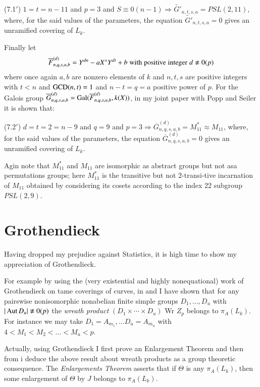 (7.1$'$) $1=t=n-11$ and $p=3$ and $S\equiv 0(n-1) \Rightarrow \widetilde{G'}_{n,t,s,a} = PSL(2,11)$, where, for the said values of the parameters, the equation $ \widetilde{G'}_{n,t,s,a}=0$ gives an unramified covering of $L_{k}$.

Finally let
$$
\overline{F}^{(d)}_{n,q,s,a,b} = Y^{dn}-aX^{x}Y^{dt} + b\; {\rm with\; positive\; integer}\; d\nequiv 0(p)
$$ 
where once again $a,b$ are nonzero elements of $k$ and $n,t,s$ are positive integers with $t<n$ and $\operatorname{GCD}(n,t)=1$ and
$n-t=q=a$ positive power of $p$. For the Galois group $\overline{G}^{(d)}_{n,q,s,a,b} = \operatorname{Gal}(\overline{F}^{(d)}_{n,q,s,a,b}, k(X))$, in my joint paper \cite{chap1-key15} with Popp and Seiler it is shown that:

(7.2$'$) $d=t=2=n-9$ and $q=9$ and $p=3 \Rightarrow \overline{G}^{(d)}_{n,q,s,a,b} =M^{*}_{11}\approx M_{11}$, where, for the said values of the parameters, the equation  $\overline{G}^{(d)}_{n,q,s,a,b} = 0$ gives an unramified covering of $L_{k}$.

Agin note that $M^{*}_{11}$ and $M_{11}$ are isomorphic as abstract groups but not asa permutations groups; here $M^{*}_{11}$ is the transitive but not 2-transi-\break tive incarnation of $M_{11}$ obtained by considering its cosets according to the index 22 subgroup $PSL(2,9)$.

\section{Grothendieck}

Having dropped my prejudice against Statistics, it is high time to show my appreciation of Grothendieck.

For example by using the (very existential and highly nonequational) work of Grothendieck \cite{chap1-key33} on tame coverings of curves, in \cite{chap1-key7} and \cite{chap1-key11} I have shown that for any pairswise nonisomorphic nonabelian finite simple groups $D_{1},\ldots, D_{u}$ with $|\Aut D_{u}| \nequiv 0(p)$ the \textit{wreath product} $(D_{1}\times\cdots\times D_{u})$ Wr $Z_{p}$ belongs to $\pi_{A}(L_{k})$. For instance we may take $D_{1}= A_{m_{1}}, \ldots D_{u} =A_{m_{u}}$ with $4 < M_{1} < M_{2} < \ldots < M_{u} < p$. 

Actually, using Grothendieck \cite{chap1-key33} I first prove an Enlargement Theorem and then from i deduce the above result about wreath products as a group theoretic consequence. The \textit{Enlargements Theorem} asserts that if $\Theta$ is any $\pi_{A}(L_{k})$, then some enlargement of $\Theta$ by $J$ belongs to $\pi_{A}(L_{k})$. 

